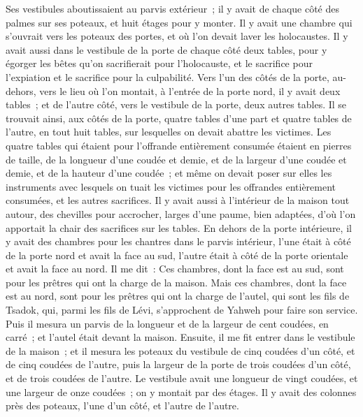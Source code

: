 \begin{multicols}{2}
Ses vestibules aboutissaient au parvis extérieur~; il y avait de chaque côté des palmes sur ses poteaux, et huit étages pour y monter.
Il y avait une chambre qui s'ouvrait vers les poteaux des portes, et où l'on devait laver les holocaustes.
Il y avait aussi dans le vestibule de la porte de chaque côté deux tables, pour y égorger les bêtes qu'on sacrifierait pour l'holocauste, et le sacrifice pour l'expiation et le sacrifice pour la culpabilité.
Vers l'un des côtés de la porte, au-dehors, vers le lieu où l'on montait, à l'entrée de la porte nord, il y avait deux tables~; et de l'autre côté, vers le vestibule de la porte, deux autres tables.
Il se trouvait ainsi, aux côtés de la porte, quatre tables d'une part et quatre tables de l'autre, en tout huit tables, sur lesquelles on devait abattre les victimes.
Les quatre tables qui étaient pour l'offrande entièrement consumée étaient en pierres de taille, de la longueur d'une coudée et demie, et de la largeur d'une coudée et demie, et de la hauteur d'une coudée~; et même on devait poser sur elles les instruments avec lesquels on tuait les victimes pour les offrandes entièrement consumées, et les autres sacrifices.
Il y avait aussi à l'intérieur de la maison tout autour, des chevilles pour accrocher, larges d'une paume, bien adaptées, d'où l'on apportait la chair des sacrifices sur les tables.
En dehors de la porte intérieure, il y avait des chambres pour les chantres dans le parvis intérieur, l'une était à côté de la porte nord et avait la face au sud, l'autre était à côté de la porte orientale et avait la face au nord.
Il me dit~: Ces chambres, dont la face est au sud, sont pour les prêtres qui ont la charge de la maison.
Mais ces chambres, dont la face est au nord, sont pour les prêtres qui ont la charge de l'autel, qui sont les fils de Tsadok, qui, parmi les fils de Lévi, s'approchent de Yahweh pour faire son service.
Puis il mesura un parvis de la longueur et de la largeur de cent coudées, en carré~; et l'autel était devant la maison.
Ensuite, il me fit entrer dans le vestibule de la maison~; et il mesura les poteaux du vestibule de cinq coudées d'un côté, et de cinq coudées de l'autre, puis la largeur de la porte de trois coudées d'un côté, et de trois coudées de l'autre.
Le vestibule avait une longueur de vingt coudées, et une largeur de onze coudées~; on y montait par des étages. Il y avait des colonnes près des poteaux, l'une d'un côté, et l'autre de l'autre.

\end{multicols}
